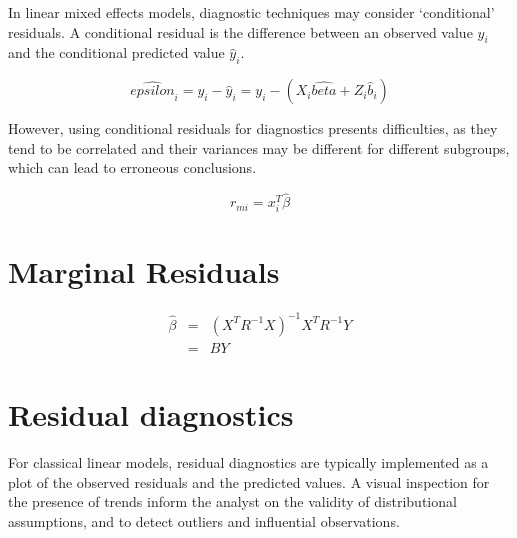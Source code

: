 \documentclass[12pt, a4paper]{report}
\theoremstyle{plain}
\theoremstyle{definition}
\theoremstyle{remark}
\begin{document}
	In linear mixed effects models, diagnostic techniques may consider `conditional' residuals. A conditional residual is the difference between an observed value $y_{i}$ and the conditional predicted value $\hat{y}_{i} $.
	
	\[ \hat{epsilon}_{i} = y_{i} - \hat{y}_{i} = y_{i} - ( X_{i}\hat{beta} + Z_{i}\hat{b}_{i}) \]
	
	However, using conditional residuals for diagnostics presents difficulties, as they tend to be correlated and their variances may be different for different subgroups, which can lead to erroneous conclusions.
	
	
	
	
	
	
	
	\begin{equation}
	r_{mi}=x^{T}_{i}\hat{\beta}
	\end{equation}
	
	\section{Marginal Residuals}
	\begin{eqnarray}
	\hat{\beta} &=& (X^{T}R^{-1}X)^{-1}X^{T}R^{-1}Y \nonumber \\
	&=& BY \nonumber
	\end{eqnarray}
	
	\section{Residual diagnostics} %
	For classical linear models, residual diagnostics are typically implemented as a plot of the observed residuals and the predicted values. A visual inspection for the presence of trends inform the analyst on the validity of distributional assumptions, and to detect outliers and influential observations.
	
	
	
	
	
	
	
\end{document}
